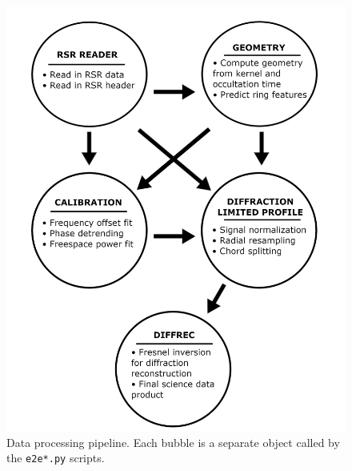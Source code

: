 \documentclass[titlepage, 12pt]{article}
\begin{document}
            \begin{figure}[H]
                \centering
                \includegraphics[width=\linewidth]{figs/ug_flowchart.png}
                \caption[Data processing pipeline]
                    {Data processing pipeline. Each bubble is a
                     separate object called by the \texttt{e2e*.py} scripts.}
                \label{fig:pipeline_schematic}
            \end{figure}
\end{document}

